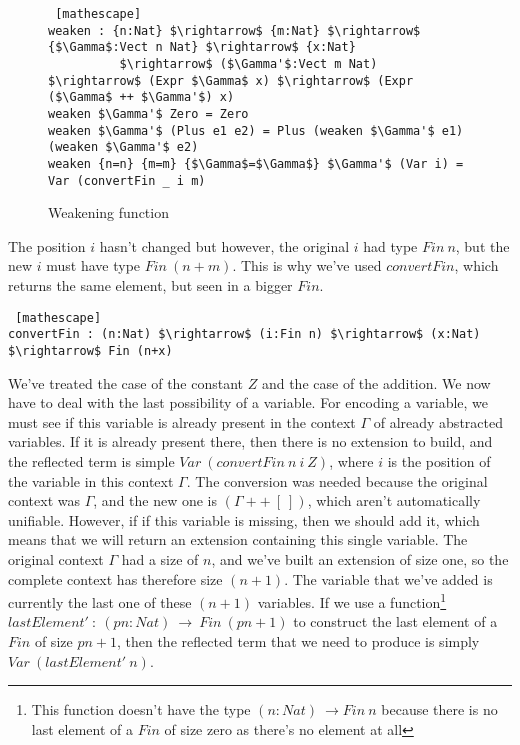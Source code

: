  \begin{figure}[H]
\figrule
\begin{center}
\begin{lstlisting} [mathescape]
weaken : {n:Nat} $\rightarrow$ {m:Nat} $\rightarrow$ {$\Gamma$:Vect n Nat} $\rightarrow$ {x:Nat} 
          $\rightarrow$ ($\Gamma'$:Vect m Nat) $\rightarrow$ (Expr $\Gamma$ x) $\rightarrow$ (Expr ($\Gamma$ ++ $\Gamma'$) x)
weaken $\Gamma'$ Zero = Zero
weaken $\Gamma'$ (Plus e1 e2) = Plus (weaken $\Gamma'$ e1) (weaken $\Gamma'$ e2)
weaken {n=n} {m=m} {$\Gamma$=$\Gamma$} $\Gamma'$ (Var i) = Var (convertFin _ i m)    
\end{lstlisting}
\end{center}
\caption{Weakening function}
\label{weaken}
\figrule
\end{figure}


The position $i$ hasn't changed but however, the original $i$ had type $Fin\ n$, but the new $i$ must have type $Fin\ (n+m)$. This is why we've used $convertFin$, which returns the same element, but seen in a bigger $Fin$.


\begin{lstlisting} [mathescape]
convertFin : (n:Nat) $\rightarrow$ (i:Fin n) $\rightarrow$ (x:Nat) $\rightarrow$ Fin (n+x)
\end{lstlisting}


We've treated the case of the constant $Z$ and the case of the addition. We now have to deal with the last possibility of a variable. For encoding a variable, we must see if this variable is already present in the context $\Gamma$ of already abstracted variables. If it is already present there, then there is no extension to build, and the reflected term is simple $Var\ (convertFin\ n\ i\ Z)$, where $i$ is the position of the variable in this context $\Gamma$. The conversion was needed because the original context was $\Gamma$, and the new one is $(\Gamma ++\ [\ ])$, which aren't automatically unifiable. However, if if this variable is missing, then we should add it, which means that we will return an extension containing this single variable. The original context $\Gamma$ had a size of $n$, and we've built an extension of size one, so the complete context has therefore size $(n+1)$. The variable that we've added is currently the last one of these  $(n+1)$ variables. If we use a function\footnote{This function doesn't have the type $(n:Nat)\ \rightarrow Fin\ n$ because there is no last element of a $Fin$ of size zero as there's no element at all}  $lastElement'\ :\ (pn:Nat)\ \rightarrow\ Fin\ (pn+1)$ to construct the last element of a $Fin$ of size $pn+1$, then the reflected term that we need to produce is simply $Var\ (lastElement'\ n)$. 

